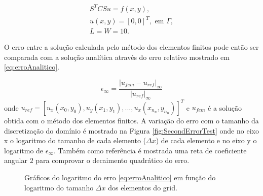 \begin{equation}\label{eq:irinaproblem}
    \begin{aligned}
        S^T C S u = f(x, y), \\
        u(x,y) = [0, 0]^T, \text{ em } \Gamma ,\\
        L = W = 10.
    \end{aligned}
\end{equation}

O erro entre a solução calculada pelo método dos elementos finitos pode então ser comparada
com a solução analítica através do erro relativo mostrado em \eqref{eq:erroAnalitico}.

\begin{equation} \label{eq:erroAnalitico}
    \epsilon_{\infty} =\frac{|u_{fem} - u_{ref}|_{\infty}}{|u_{ref}|_{\infty}}
\end{equation}
onde $u_{ref} = [u_x(x_0, y_0), u_y(x_1, y_1), ..., u_x(x_{n_n}, y_{n_n})]^T$ e $u_{fem}$ é a solução obtida com o método dos elementos finitos. A variação do erro com o tamanho da discretização do domínio é mostrado na Figura  \ref{fig:SecondErrorTest} onde no eixo x o logaritmo do tamanho de cada elemento ($\Delta x$) de cada elemento e no eixo y o logaritmo de $\epsilon_{\infty}$. Também como referência é mostrada uma reta de coeficiente angular $2$ para comprovar o decaimento quadrático do erro.


\begin{figure}[h]
\center
{}
\qquad
{}
\caption{Gráficos do logaritmo do erro \eqref{eq:erroAnalitico} em função do logaritmo do tamanho $\Delta x$ dos elementos do grid.}
\end{figure}
    
